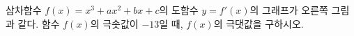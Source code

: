 \noindent\begin{minipage}[t]{0.58\linewidth}\vspace{0pt}\raggedright 삼차함수 $f(x)=x^3+ax^2+bx+c$의 도함수 $y=f'(x)$의 그래프가 오른쪽 그림과 같다. 함수 $f(x)$의 극솟값이 $-13$일 때, $f(x)$의 극댓값을 구하시오. \end{minipage}\hfill\begin{minipage}[t]{0.4\linewidth}\vspace{0pt}\centering \resizebox{\ifdim\width>\linewidth\linewidth\else\width\fi}{!}{}\end{minipage}\par
